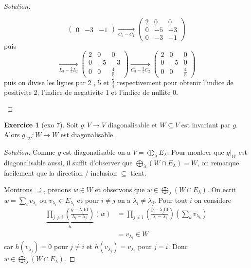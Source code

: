 \documentclass[a4paper,12pt,french]{report}
\theoremstyle{plain}
\theoremstyle{definition}
\newtheorem{exercise}{Exercice}[chapter]
\begin{document}
\begin{proof}[Solution]
\begin{itemize}
$$\begin{pmatrix}
0 & -3 & -1
\end{pmatrix} \underset{C_{3}-C_{1}}\longrightarrow \begin{pmatrix}
2 & 0 & 0 \\
0 & -5 & -3 \\
0 & -3 & -1
\end{pmatrix}
$$
puis
$$
\underset{L_{3}-\frac{3}{5}L_{2}}\longrightarrow \begin{pmatrix}
2 & 0 & 0 \\
0 & -5 & -3 \\
0 & 0 & \frac{4}{5}
\end{pmatrix} \underset{C_{3}-\frac{3}{5}C_{2}}\longrightarrow \begin{pmatrix}
2 & 0 & 0 \\
0 & -5 & 0 \\
0 & 0 & \frac{4}{5}
\end{pmatrix}
$$
puis on divise les lignes par 2 , 5 et $\frac{5}{4}$ respectivement pour obtenir l'indice de positivite 2, l'indice de negativite 1 et l'indice de nullite 0.
\end{itemize}
\end{proof}
\begin{exercise}[exo 7]\label{exo7}
Soit $g:V\to V$ diagonalisable et $W\subseteq V$ est invariant par $g$. Alors $g|_{W}:W\to W$ est diagonalisable.
\end{exercise}
\begin{proof}[Solution]
Comme $g$ est diagonalisable on a $V=\bigoplus _{\lambda}E_{\lambda}$. Pour montrer que $g|_{W}$ est diagonalisable aussi, il suffit d'observer que $\bigoplus _{\lambda}(W\cap E_{\lambda})=W$, on remarque facilement que la direction / inclusion $\subseteq$ tient. 

Montrons $\supseteq$, prenons $w\in W$ et observons que $w\in \bigoplus_{\lambda}(W\cap E_{\lambda})$. On ecrit $w=\sum _{i} v_{\lambda _{i}}$ ou $v_{\lambda _{i}}\in E_{\lambda _{i}}$ et pour $i\neq j$ on a $\lambda _{i}\neq\lambda _{j}$. Pour tout $i$ on considere 
\begin{align*}
\underbrace{ \prod _{j\neq i} \left( \frac{g-\lambda _{j}\mathrm{Id}}{\lambda _{i}-\lambda _{j}} \right) }_{ h }(w) & =\prod _{j\neq i} \left( \frac{g-\lambda _{j}\mathrm{Id}}{\lambda _{i}-\lambda _{j}} \right)\left( \sum _{k}v_{\lambda _{k}} \right) \\
 & =v_{\lambda _{i}}\in W
\end{align*}
car $h(v_{\lambda _{j}})=0$ pour $j\neq i$ et $h(v_{\lambda _{j}})=v_{\lambda _{i}}$ pour $j=i$. Donc $w\in \bigoplus _{\lambda}(W\cap E_{\lambda})$.
\end{proof}
\end{document}
